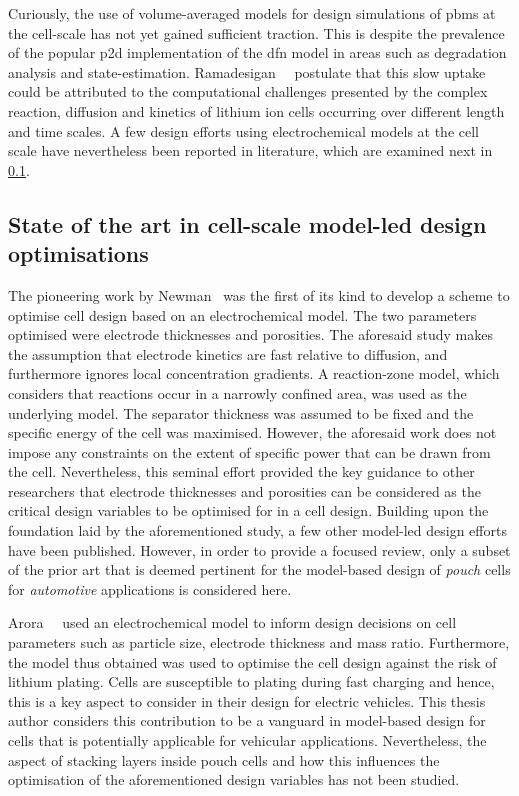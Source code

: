Curiously,  the  use  of  volume-averaged   models  for  design  simulations  of
\glspl{pbm}  at the  cell-scale has  not  yet gained  sufficient traction.  This
is  despite  the prevalence  of  the  popular  \gls{p2d} implementation  of  the
\gls{dfn}  model in  areas such  as degradation  analysis and  state-estimation.
Ramadesigan~\etal~\cite{Ramadesigan2012} postulate  that this slow  uptake could
be attributed to the computational challenges presented by the complex reaction,
diffusion and kinetics of lithium ion  cells occurring over different length and
time scales. A few design efforts using electrochemical models at the cell scale
have  nevertheless been  reported  in  literature, which  are  examined next  in
\cref{sec:cellscaledesignlittreview}.

\subsection{State of the art in cell-scale model-led design optimisations}\label{sec:cellscaledesignlittreview}

The  pioneering work  by  Newman~\cite{Newman1995}  was the  first  of its  kind
to  develop  a scheme  to  optimise  cell  design  based on  an  electrochemical
model. The two  parameters optimised were electrode  thicknesses and porosities.
The  aforesaid study  makes  the  assumption that  electrode  kinetics are  fast
relative to diffusion, and furthermore  ignores local concentration gradients. A
reaction-zone model, which considers that reactions occur in a narrowly confined
area, was used  as the underlying model. The separator  thickness was assumed to
be  fixed and  the  specific energy  of  the cell  was  maximised. However,  the
aforesaid work does  not impose any constraints on the  extent of specific power
that can be drawn from the  cell. Nevertheless, this seminal effort provided the
key guidance to other researchers  that electrode thicknesses and porosities can
be considered  as the critical  design variables to be  optimised for in  a cell
design. Building  upon the foundation  laid by  the aforementioned study,  a few
other model-led design efforts have been published. However, in order to provide
a focused review,  only a subset of  the prior art that is  deemed pertinent for
the model-based design of  \emph{pouch} cells for \emph{automotive} applications
is considered here.

Arora~\etal~\cite{Arora1999}  used an  electrochemical  model  to inform  design
decisions on cell parameters such as particle size, electrode thickness and mass
ratio. Furthermore, the model thus obtained was used to optimise the cell design
against the  risk of lithium  plating. Cells  are susceptible to  plating during
fast charging and  hence, this is a  key aspect to consider in  their design for
electric  vehicles. This  thesis  author  considers this  contribution  to be  a
vanguard  in model-based  design for  cells that  is potentially  applicable for
vehicular applications. Nevertheless, the aspect of stacking layers inside pouch
cells  and how  this influences  the optimisation  of the  aforementioned design
variables has not been studied.

